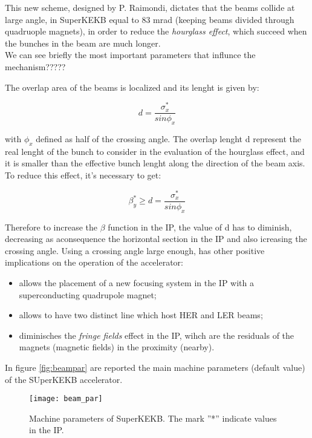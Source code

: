 This new scheme, designed by P. Raimondi, dictates that the beams collide at large angle, in SuperKEKB equal to 83 mrad (keeping beams divided through quadruople magnets), in order to reduce the \textit{hourglass effect}, which succeed when the bunches in the beam are much longer.\\
We can see briefly the most important parameters that influnce the mechanism?????

The overlap area of the beams is localized and its lenght is given by:

\begin{equation}
d = \frac{\sigma_{x}^{*}}{sin\phi_{x}}
\end{equation}

with $\phi_{x}$ defined as half of the crossing angle. The overlap lenght d represent the real lenght of the bunch to consider in the evaluation of the hourglass effect, and it is smaller than the effective bunch lenght along the direction of the beam axis. To reduce this effect, it's necessary to get:

\begin{equation}
\beta_{y}^{*} \geq d = \frac{\sigma_{x}^{*}}{sin\phi_{x}}
\end{equation}

Therefore to increase the $\beta$ function in the IP, the value of d has to diminish, decreasing as aconsequence the horizontal section in the IP and also icreasing the crossing angle.
Using a crossing angle large enough, has other positive implications on the operation of the accelerator:

\begin{itemize}
\item allows the placement of a new focusing system in the IP with a superconducting quadrupole magnet;
\item allows to have two distinct line which host HER and LER beams;
\item diminisches the \textit{fringe fields} effect in the IP, wihch are the residuals of the magnets (magnetic fields) in the proximity (nearby). 
\end{itemize}

In figure \vref{fig:beampar} are reported the main machine parameters (default value) of the SUperKEKB accelerator.

\begin{figure}
\centering
\texttt{[image: beam\_par]}
\caption{Machine parameters of SuperKEKB. The mark ''*'' indicate values in the IP.}
\label{fig:beampar}
\end{figure}

